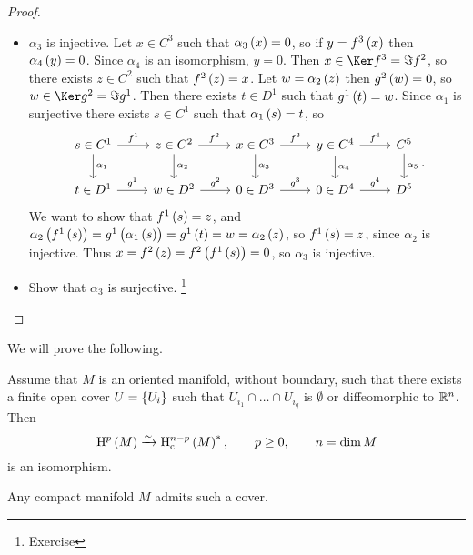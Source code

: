 \begin{proof}
\hfill
\begin{itemize}
\item $ \alpha_3 $ is injective. Let $ x \in C^3 $ such that $ \alpha_3\br{x} = 0 $, so if $ y = f^3\br{x} $ then $ \alpha_4\br{y} = 0 $. Since $ \alpha_4 $ is an isomorphism, $ y = 0 $. Then $ x \in \Ker f^3 = \Im f^2 $, so there exists $ z \in C^2 $ such that $ f^2\br{z} = x $. Let $ w = \alpha_2\br{z} $ then $ g^2\br{w} = 0 $, so $ w \in \Ker g^2 = \Im g^1 $. Then there exists $ t \in D^1 $ such that $ g^1\br{t} = w $. Since $ \alpha_1 $ is surjective there exists $ s \in C^1 $ such that $ \alpha_1\br{s} = t $, so
$$
\begin{tikzcd}
s \in C^1 \arrow{r}{f^1} \arrow{d}{\alpha_1} & z \in C^2 \arrow{r}{f^2} \arrow{d}{\alpha_2} & x \in C^3 \arrow{r}{f^3} \arrow{d}{\alpha_3} & y \in C^4 \arrow{r}{f^4} \arrow{d}{\alpha_4} & C^5 \arrow{d}{\alpha_5} \\
t \in D^1 \arrow{r}{g^1} & w \in D^2 \arrow{r}{g^2} & 0 \in D^3 \arrow{r}{g^3} & 0 \in D^4 \arrow{r}{g^4} & D^5
\end{tikzcd}.
$$
We want to show that $ f^1\br{s} = z $, and $ \alpha_2\br{f^1\br{s}} = g^1\br{\alpha_1\br{s}} = g^1\br{t} = w = \alpha_2\br{z} $, so $ f^1\br{s} = z $, since $ \alpha_2 $ is injective. Thus $ x = f^2\br{z} = f^2\br{f^1\br{s}} = 0 $, so $ \alpha_3 $ is injective.
\item Show that $ \alpha_3 $ is surjective. \footnote{Exercise}
\end{itemize}
\end{proof}

\pagebreak

We will prove the following.

\begin{theorem}
Assume that $ M $ is an oriented manifold, without boundary, such that there exists a finite open cover $ U = \cbr{U_i} $ such that $ U_{i_1} \cap \dots \cap U_{i_q} $ is $ \emptyset $ or diffeomorphic to $ \mathbb{R}^n $. Then
$$ \H^p\br{M} \xrightarrow{\sim} \H_\c^{n - p}\br{M}^*, \qquad p \ge 0, \qquad n = \dim M $$
is an isomorphism.
\end{theorem}

Any compact manifold $ M $ admits such a cover.



